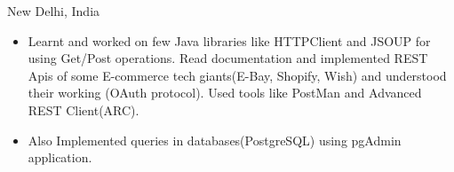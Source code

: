 \documentclass[10pt,a4paper,ragged2e]{altacv}
\begin{document}
     {New Delhi, India}
\begin{itemize}
\item Learnt and worked on few Java libraries like HTTPClient and JSOUP for using Get/Post operations. Read documentation and implemented REST Apis of some E-commerce tech giants(E-Bay, Shopify, Wish) and understood their working (OAuth protocol). Used tools like PostMan and Advanced REST Client(ARC).
\item Also Implemented queries in databases(PostgreSQL) using pgAdmin application. 
\end{itemize}

\divider








\clearpage


\nocite{*}






\end{document}

